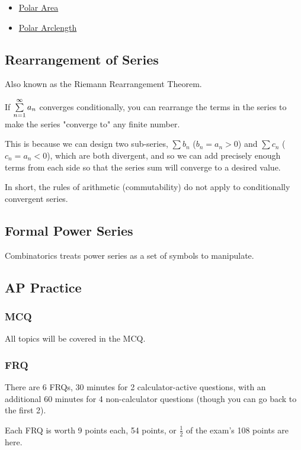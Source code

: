 \documentclass{article}
\begin{document}
\begin{itemize}
    \item \href{https://www.wolframalpha.com/widgets/view.jsp?id=769788ade06411e063edbd51239787f9}{Polar Area}
    \item \href{https://www.wolframalpha.com/widgets/view.jsp?id=c26cbb9457ff75f58f479364ddb79cd1}{Polar Arclength}
\end{itemize}

\subsection{Rearrangement of Series}
Also known as the Riemann Rearrangement Theorem.

If $\sum_{n=1}^{\infty}\limits a_n$ converges conditionally, you can rearrange the terms in the series to make the series "converge to" any finite number.

This is because we can design two sub-series, $\sum b_n$ ($b_n = a_n > 0$) and $\sum c_n$ ($c_n = a_n < 0$), which are both divergent, and so we can add precisely enough terms from each side so that the series sum will converge to a desired value.

In short, the rules of arithmetic (commutability) do not apply to conditionally convergent series.

\subsection{Formal Power Series}
Combinatorics treats power series as a set of symbols to manipulate.

\subsection{AP Practice}
\subsubsection{MCQ}
All topics will be covered in the MCQ.

\subsubsection{FRQ}
There are 6 FRQs, 30 minutes for 2 calculator-active questions, with an additional 60 minutes for 4 non-calculator questions (though you can go back to the first 2).

Each FRQ is worth 9 points each, 54 points, or $\frac{1}{2}$ of the exam's 108 points are here.
\end{document}
